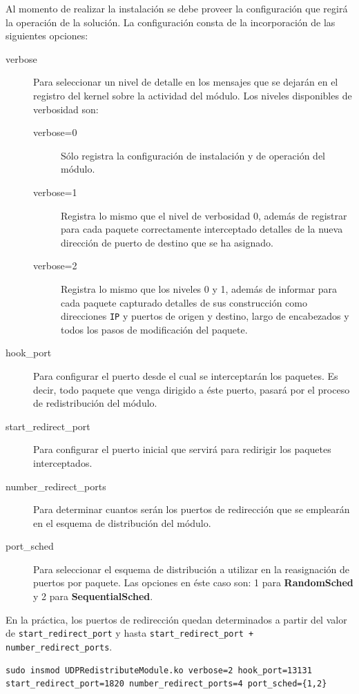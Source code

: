 Al momento de realizar la instalación se debe proveer la configuración que regirá la operación de la solución. La configuración consta de la incorporación de las siguientes opciones:

\begin{description}
\item[verbose] Para seleccionar un nivel de detalle en los mensajes que se dejarán en el registro del kernel sobre la actividad del módulo. Los niveles disponibles de verbosidad son:
\begin{description}
\item[verbose=0] Sólo registra la configuración de instalación y de operación del módulo.
\item[verbose=1] Registra lo mismo que el nivel de verbosidad 0, además de registrar para cada paquete correctamente interceptado detalles de la nueva dirección de puerto de destino que se ha asignado.
\item[verbose=2] Registra lo mismo que los niveles 0 y 1, además de informar para cada paquete capturado detalles de sus construcción como direcciones \verb=IP= y puertos de origen y destino, largo de encabezados y todos los pasos de modificación del paquete.
\end{description}
\item[hook\_port] Para configurar el puerto desde el cual se interceptarán los paquetes. Es decir, todo paquete que venga dirigido a éste puerto, pasará por el proceso de redistribución del módulo.
\item[start\_redirect\_port] Para configurar el puerto inicial que servirá para redirigir los paquetes interceptados.
\item[number\_redirect\_ports] Para determinar cuantos serán los puertos de redirección que se emplearán en el esquema de distribución del módulo.
\item[port\_sched] Para seleccionar el esquema de distribución a utilizar en la reasignación de puertos por paquete. Las opciones en éste caso son: 1 para \textbf{RandomSched} y 2 para \textbf{SequentialSched}.
\end{description}

En la práctica, los puertos de redirección quedan determinados a partir del valor de \verb=start_redirect_port= y hasta \verb=start_redirect_port + number_redirect_ports=.

\begin{lstlisting}[caption=ESO3]
sudo insmod UDPRedistributeModule.ko verbose=2 hook_port=13131 start_redirect_port=1820 number_redirect_ports=4 port_sched={1,2}
\end{lstlisting}


